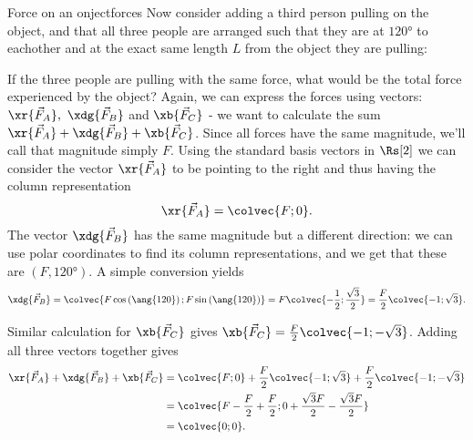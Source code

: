 \begin{example}{Force on an onject}{forces}
  \vspace{1em}
  Now consider adding a third person pulling on the object, and that all three people are arranged such that they are at $\ang{120}$ to eachother and at the exact same length $L$ from the object they are pulling:
  
  \begin{center}
  \end{center}

  If the three people are pulling with the same force, what would be the total force experienced by the object? Again, we can express the forces using vectors: $\xr{\vec{F}_{A}},\ \xdg{\vec{F}_{B}}$ and $\xb{\vec{F}_{C}}$ - we want to calculate the sum $\xr{\vec{F}_{A}}+\xdg{\vec{F}_{B}}+\xb{\vec{F}_{C}}$. Since all forces have the same magnitude, we'll call that magnitude simply $F$. Using the standard basis vectors in $\Rs[2]$ we can consider the vector $\xr{\vec{F}_{A}}$ to be pointing to the right and thus having the column representation
  \[
    \xr{\vec{F}_{A}} = \colvec{F;0}.
  \]
  The vector $\xdg{\vec{F}_{B}}$ has the same magnitude but a different direction: we can use polar coordinates to find its column representations, and we get that these are $(F,\ang{120})$. A simple conversion yields
  \[
    \xdg{\vec{F}_{B}} = \colvec{F\cos\left(\ang{120}\right);F\sin\left(\ang{120}\right)} = F\colvec{-\frac{1}{2};\frac{\sqrt{3}}{2}} = \frac{F}{2}\colvec{-1;\sqrt{3}}.
  \]

  Similar calculation for $\xb{\vec{F}_{C}}$ gives $\xb{\vec{F}_{C}}=\frac{F}{2}\colvec{-1;-\sqrt{3}}$. Adding all three vectors together gives
  \begin{align*}
    \xr{\vec{F}_{A}}+\xdg{\vec{F}_{B}}+\xb{\vec{F}_{C}} &= \colvec{F;0} + \frac{F}{2}\colvec{-1;\sqrt{3}} + \frac{F}{2}\colvec{-1;-\sqrt{3}}\\
                                                        &= \colvec{F-\frac{F}{2}+\frac{F}{2};0+\frac{\sqrt{3}F}{2}-\frac{\sqrt{3}F}{2}}\\
                                                        &= \colvec{0;0}.
  \end{align*}


\end{example}
